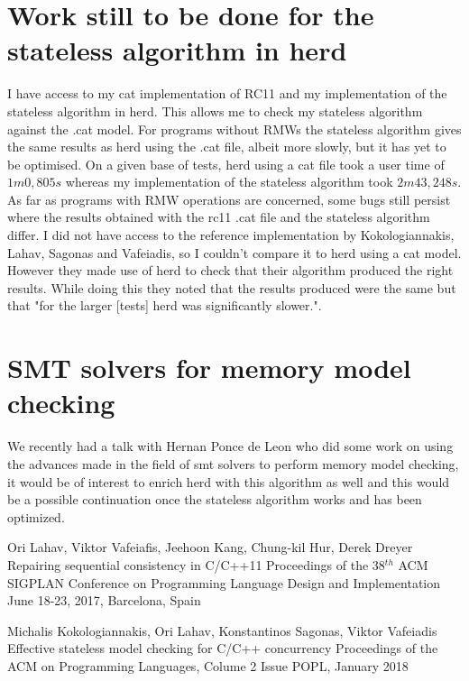 \documentclass[a4,11pt,dvipsnames]{article}
\begin{document}
\section{Work still to be done for the stateless algorithm in herd}

I have access to my cat implementation of RC11 and my implementation of the stateless algorithm in herd. This allows me to check my stateless algorithm against the .cat model. For programs without RMWs the stateless algorithm gives the same results as herd using the .cat file, albeit more slowly, but it has yet to be optimised. On a given base of tests, herd using a cat file took a user time of $1m0,805s$ whereas my implementation of the stateless algorithm took $2m43,248s$. As far as programs with RMW operations are concerned, some bugs still persist where the results obtained with the rc11 .cat file and the stateless algorithm differ. I did not have access to the reference implementation by Kokologiannakis, Lahav, Sagonas and Vafeiadis, so I couldn't compare it to herd using a cat model. However they made use of herd to check that their algorithm produced the right results. While doing this they noted that the results produced were the same but that "for the larger [tests] herd was significantly slower.".

\section{SMT solvers for memory model checking}

We recently had a talk with Hernan Ponce de Leon who did some work on using the advances made in the field of smt solvers to perform memory model checking, it would be of interest to enrich herd with this algorithm as well and this would be a possible continuation once the stateless algorithm works and has been optimized.

\begin{thebibliography}{9}

	Ori Lahav, Viktor Vafeiafis, Jeehoon Kang, Chung-kil Hur, Derek Dreyer
	Repairing sequential consistency in C/C++11
	Proceedings of the 38$^{th}$ ACM SIGPLAN Conference on Programming Language Design and Implementation
	June 18-23, 2017, Barcelona, Spain

	Michalis Kokologiannakis, Ori Lahav, Konstantinos Sagonas, Viktor Vafeiadis
	Effective stateless model checking for C/C++ concurrency
	Proceedings of the ACM on Programming Languages, Colume 2 Issue POPL,
	January 2018
\end{thebibliography}
\end{document}
